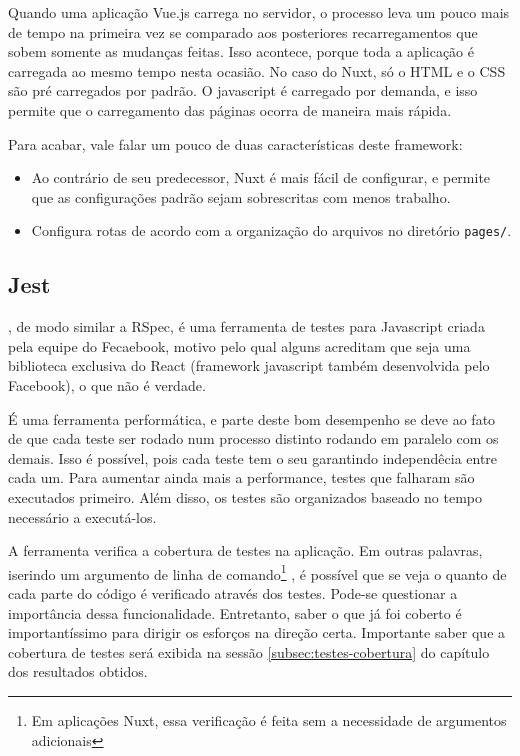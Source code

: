Quando uma aplicação Vue.js carrega no servidor, o processo leva um pouco mais de tempo na primeira
vez se comparado aos posteriores recarregamentos que sobem somente as mudanças feitas. Isso acontece,
porque toda a aplicação é carregada ao mesmo tempo nesta ocasião. No caso do Nuxt, só o HTML e o CSS
são pré carregados por padrão. O javascript é carregado por demanda, e isso permite que o carregamento
das páginas ocorra de maneira mais rápida.

Para acabar, vale falar um pouco de duas características deste framework:
\begin{itemize}
    \item Ao contrário de seu predecessor, Nuxt é mais fácil de configurar, e permite que as configurações
    padrão sejam sobrescritas com menos trabalho.
    \item Configura rotas de acordo com a organização do arquivos no diretório \texttt{pages/}.
\end{itemize}

\subsection{Jest}\label{subsec:jest}

, de modo similar a RSpec, é uma ferramenta de testes para Javascript criada pela equipe do Fecaebook,
motivo pelo qual alguns acreditam que seja uma biblioteca exclusiva do React (framework javascript também
desenvolvida pelo Facebook), o que não é verdade.

É uma ferramenta performática, e parte deste bom desempenho se deve ao fato de que cada teste ser rodado
num processo distinto rodando em paralelo com os demais. Isso é possível, pois cada teste tem o seu
 garantindo independêcia entre cada um. Para aumentar ainda mais a performance, testes
que falharam são executados primeiro. Além disso, os testes são organizados baseado no tempo necessário a
executá-los.

A ferramenta verifica a cobertura de testes na aplicação. Em outras palavras, iserindo um argumento de linha
de comando\footnote{Em aplicações Nuxt, essa verificação é feita sem a necessidade de argumentos adicionais}
\texttt{}, é possível que se veja o quanto de cada parte do código é verificado através dos
testes. Pode-se questionar a importância dessa funcionalidade. Entretanto, saber o que já foi coberto é
importantíssimo para dirigir os esforços na direção certa. Importante saber que a cobertura de testes será
exibida na sessão \ref{subsec:testes-cobertura} do capítulo dos resultados obtidos.

